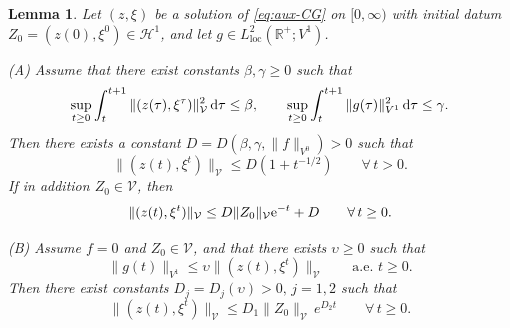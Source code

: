 \documentclass[12pt,leqno]{amsart}
\def\e{{\rm e}}
\def\d{{\rm d}}
\def\R {\mathbb{R}}
\def\loc {{\mathrm{loc}}}
\newtheorem{lemma}[theorem]{Lemma}
\theoremstyle{definition}
\numberwithin{equation}{section}
\numberwithin{figure}{section}
\begin{document}
\begin{lemma} \label{lem:CGDP55-56-updated}
Let $(z,\xi)$ be a solution of \eqref{eq:aux-CG} on $[0,\infty)$ with initial datum
$Z_0=(z(0),\xi^0)\in\mathcal H^{1}$, and let $g\in L^2_{\loc}(\R^+;{V^1})$.

\smallskip
\noindent\textup{(A)} 
Assume that there exist constants $\beta,\gamma\ge0$ such that
\begin{equation}\label{eq:CGDP55-ass1-updated}
\sup_{t\ge0}\int_t^{t+1}\|(z(\tau),\xi^\tau)\|_{\mathcal V}^2\,\d\tau \le \beta,
\qquad 
\sup_{t\ge0}\int_t^{t+1}\|g(\tau)\|_{{V^1}}^2\,\d\tau \le \gamma .
\end{equation}
Then there exists a constant $D=D(\beta,\gamma,\|f\|_{V^0})>0$ such that
\begin{equation}\label{eq:CGDP55-concl-updated}
\|(z(t),\xi^t)\|_{\mathcal V}\le D\left(1+t^{-1/2}\right)
\qquad \forall\,t>0.
\end{equation}
If in addition $Z_0\in\mathcal V$, then
\begin{equation}\label{eq:CGDP55-concl-V0-updated}
\|(z(t),\xi^t)\|_{\mathcal V}\le D\|Z_0\|_{\mathcal V}\e^{-t}+D
\qquad \forall\,t\ge0.
\end{equation}

\smallskip
\noindent\textup{(B)}
Assume $f=0$ and $Z_0\in\mathcal V$, and that there exists $\upsilon \ge0$ such that
\begin{equation}\label{eq:CGDP56-ass-updated}
\|g(t)\|_{{V^1}}\le  \upsilon\|(z(t),\xi^t)\|_{\mathcal V}
\qquad\text{a.e. }t\ge0.
\end{equation}
Then there exist constants $D_j=D_j(\upsilon)>0, \, j=1,2$ such that
\begin{equation}\label{eq:CGDP56-concl-updated}
\|(z(t),\xi^t)\|_{\mathcal V}\le D_1\|Z_0\|_{\mathcal V}\,e^{D_2 t}
\qquad \forall\,t\ge0.
\end{equation}
\end{lemma}
\end{document}

